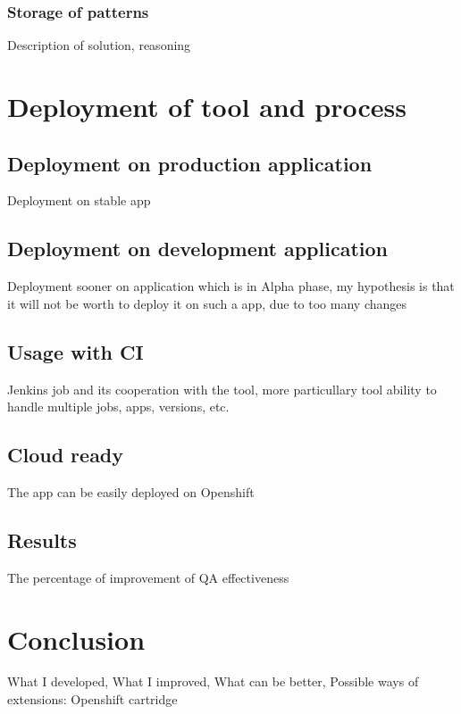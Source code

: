 \documentclass[11pt,oneside,final]{fithesis2}
\begin{document}
    \subsection{Storage of patterns}
    Description of solution, reasoning
    
\chapter{Deployment of tool and process}

  \section{Deployment on production application}
  Deployment on stable app
  
  \section{Deployment on development application}
  Deployment sooner on application which is in Alpha phase, my hypothesis is that it will not be worth to deploy it on such a app, due to too many changes
  
  \section{Usage with CI}
  Jenkins job and its cooperation with the tool, more particullary tool ability to handle multiple jobs, apps, versions, etc.
  
  \section{Cloud ready}
  The app can be easily deployed on Openshift
  
  \section{Results}
  The percentage of improvement of QA effectiveness
  
\chapter{Conclusion}
What I developed, What I improved, What can be better, Possible ways of extensions: Openshift cartridge
    
    \pagestyle{plain}
    
\end{document}
